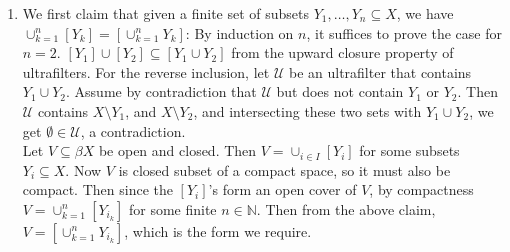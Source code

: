 \documentclass{article}
\begin{document}
\begin{enumerate}
  \item We first claim that given a finite set of subsets
    $Y_1,\ldots,Y_n\subseteq X$, we have
    $\cup_{k=1}^n[Y_k]=[\cup_{k=1}^nY_k]$: By induction on $n$, it suffices
    to prove the case for $n=2$.  $[Y_1]\cup[Y_2]\subseteq[Y_1\cup Y_2]$
    from the upward closure property of ultrafilters. For the reverse
    inclusion, let $\mathcal{U}$ be an ultrafilter that contains $Y_1\cup
    Y_2$. Assume by contradiction that $\mathcal{U}$ but does not contain
    $Y_1$ or $Y_2$. Then $\mathcal{U}$ contains $X\setminus Y_1$, and
    $X\setminus Y_2$, and intersecting these two sets with $Y_1\cup Y_2$,
    we get $\emptyset\in\mathcal{U}$, a contradiction. \\
  
    Let $V\subseteq\beta X$ be open and closed. Then $V=\cup_{i\in
    I}[Y_i]$ for some subsets $Y_i\subseteq X$. Now $V$ is closed subset of
    a compact space, so it must also be compact. Then since the $[Y_i]$'s
    form an open cover of $V$, by compactness $V=\cup_{k=1}^n[Y_{i_k}]$ for
    some finite $n\in\mathbb{N}$. Then from the above claim,
    $V=[\cup_{k=1}^nY_{i_k}]$, which is the form we require.
\end{enumerate}
\end{document}
